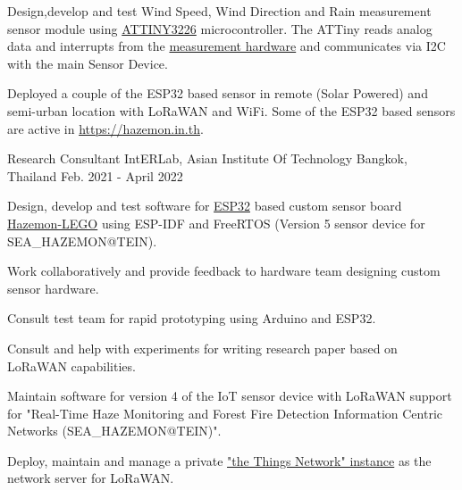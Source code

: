 \begin{cventries}
{\begin{cvitems}
    		\item {Design,develop and test Wind Speed, Wind Direction and Rain measurement sensor module using \href{https://www.microchip.com/en-us/product/ATTINY3226}{ATTINY3226} microcontroller. The ATTiny reads analog data and interrupts from the \href{https://www.dfrobot.com/product-1308.html}{measurement hardware} and communicates via I2C with the main Sensor Device.}
    		\item {Deployed a couple of the ESP32 based sensor in remote (Solar Powered) and semi-urban location with LoRaWAN and WiFi. Some of the ESP32 based sensors are active in \url{https://hazemon.in.th}.}
  \end{cvitems}}

  \cventry
  {Research Consultant} %
  {IntERLab, Asian Institute Of Technology} %
  {Bangkok, Thailand} %
  {Feb. 2021 - April 2022} %
  {\begin{cvitems} %
  		\item {Design, develop and test software for \href{https://www.espressif.com/en/products/socs/esp32}{ESP32} based custom sensor board \href{https://lora.hazemon.in.th/can5/firmware/Hazemon-LEGO-Brochure.pdf}{Hazemon-LEGO} using ESP-IDF and FreeRTOS (Version 5 sensor device for SEA\_HAZEMON@TEIN).}
  		\item {Work collaboratively and provide feedback to hardware team designing custom sensor hardware.}
  		\item {Consult test team for rapid prototyping using Arduino and ESP32.}
  		\item {Consult and help with experiments for writing research paper based on LoRaWAN capabilities.}
  		\item {Maintain software for version 4 of the IoT sensor device with LoRaWAN support for "Real-Time Haze Monitoring and Forest Fire Detection Information Centric Networks (SEA\_HAZEMON@TEIN)".}
  		\item {Deploy, maintain and manage a private \href{https://ttn.hazemon.in.th/}{"the Things Network" instance} as the network server for LoRaWAN.}
  \end{cvitems}}


\end{cventries}
